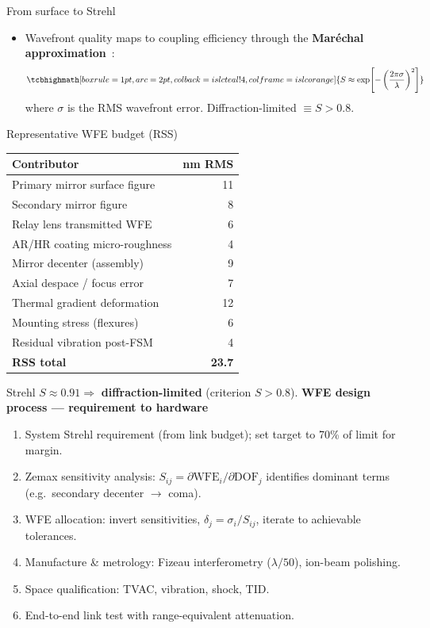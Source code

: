 \documentclass{KAIST-slide}
\newcommand{\ai}{\item[\textcolor{islcteal}{\ding{228}}]}      %
\newcommand{\key}[1]{\textcolor{islcblue}{\textbf{#1}}}        %
\begin{document}
\begin{frame}[allowframebreaks=1.2]{From surface to Strehl}
    \begin{itemize}
        \ai Wavefront quality maps to coupling efficiency through the \key{Mar\'echal approximation}~\cite{born1999principles}:
        \begin{equation*}
            \tcbhighmath[boxrule=1pt,arc=2pt,colback=islcteal!4,colframe=islcorange]{%
            S \approx \exp\!\left[-\left(\frac{2\pi\sigma}{\lambda}\right)^{2}\right]}
        \end{equation*}
        where $\sigma$ is the RMS wavefront error. Diffraction-limited $\equiv S>0.8$.
    \end{itemize}
    \framebreak
    \begin{block}{Representative WFE budget (RSS)}
    \centering\scriptsize
    \begin{tabular}{l r}
        \hline
        \textbf{Contributor} & \textbf{nm RMS}\\
        \hline
        Primary mirror surface figure & 11\\
        Secondary mirror figure       & 8\\
        Relay lens transmitted WFE    & 6\\
        AR/HR coating micro-roughness & 4\\
        Mirror decenter (assembly)    & 9\\
        Axial despace / focus error   & 7\\
        Thermal gradient deformation  & 12\\
        Mounting stress (flexures)    & 6\\
        Residual vibration post-FSM   & 4\\
        \hline
        \textbf{RSS total} & \textbf{23.7}\\
        \hline
    \end{tabular}
    \end{block}
    \centering Strehl $S\approx0.91 \Rightarrow$ \key{diffraction-limited} (criterion $S>0.8$).
    \framebreak
    \textbf{WFE design process --- requirement to hardware}
    \begin{enumerate}[label=\arabic*.]\footnotesize
        \item System Strehl requirement (from link budget); set target to 70\% of limit for margin.
        \item Zemax sensitivity analysis: $S_{ij}=\partial\text{WFE}_i/\partial\text{DOF}_j$ identifies dominant terms (e.g.\ secondary decenter $\to$ coma).
        \item WFE allocation: invert sensitivities, $\delta_j=\sigma_i/S_{ij}$, iterate to achievable tolerances.
        \item Manufacture \& metrology: Fizeau interferometry ($\lambda/50$), ion-beam polishing.
        \item Space qualification: TVAC, vibration, shock, TID.
        \item End-to-end link test with range-equivalent attenuation.
    \end{enumerate}
\end{frame}
\end{document}
